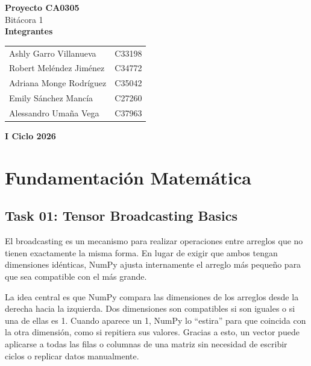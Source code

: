 ﻿\documentclass[12pt]{article}
\begin{document}
\begin{titlepage}
\centering

\vspace*{\fill}
{\Large \textbf{Proyecto CA0305}} \\
{\large Bitácora 1} \\
\vspace{2cm}
{\large \textbf{Integrantes}} \\
\vspace{1cm}
\begin{tabular}{p{6cm} p{2cm}}
Ashly Garro Villanueva & C33198 \\
Robert Meléndez Jiménez & C34772 \\
Adriana Monge Rodríguez & C35042 \\
Emily Sánchez Mancía & C27260 \\
Alessandro Umaña Vega & C37963 \\
\end{tabular}

\vspace{2cm}

{\large \textbf{I Ciclo 2026}}
\vspace*{\fill}

\end{titlepage}

\newpage

\section*{Fundamentación Matemática}

\subsection*{Task 01: Tensor Broadcasting Basics}
El broadcasting es un mecanismo para realizar operaciones entre arreglos que no tienen exactamente la misma forma. En lugar de exigir que ambos tengan dimensiones idénticas, NumPy ajusta internamente el arreglo más pequeño para que sea compatible con el más grande. 

La idea central es que NumPy compara las dimensiones de los arreglos desde la derecha hacia la izquierda. Dos dimensiones son compatibles si son iguales o si una de ellas es 1. Cuando aparece un 1, NumPy lo “estira” para que coincida con la otra dimensión, como si repitiera sus valores. Gracias a esto, un vector puede aplicarse a todas las filas o columnas de una matriz sin necesidad de escribir ciclos o replicar datos manualmente.
\end{document}

